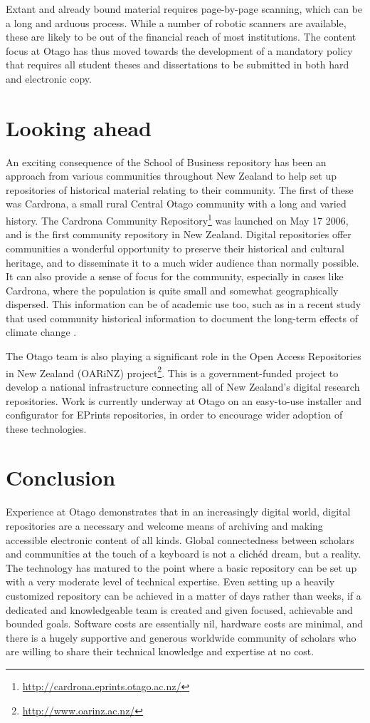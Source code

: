 \documentclass[12pt,pdftex,a4paper,titlepage]{article}
\begin{document}
Extant and already bound material requires page-by-page scanning, which can be a long and arduous process. While a number of robotic scanners are available, these are likely to be out of the financial reach of most institutions.  The content focus at Otago has thus moved towards the development of a mandatory policy that requires all student theses and dissertations to be submitted in both hard and electronic copy.


\section{Looking ahead}

An exciting consequence of the School of Business repository has been an approach from various communities throughout New Zealand to help set up repositories of historical material relating to their community. The first of these was Cardrona, a small rural Central Otago community with a long and varied history. The Cardrona Community Repository\footnote{\url{http://cardrona.eprints.otago.ac.nz/}} was launched on May 17 2006, and is the first community repository in New Zealand. Digital repositories offer communities a wonderful opportunity to preserve their historical and cultural heritage, and to disseminate it to a much wider audience than normally possible. It can also provide a sense of focus for the community, especially in cases like Cardrona, where the population is quite small and somewhat geographically dispersed. This information can be of academic use too, such as in a recent study that used community historical information to document the long-term effects of climate change \cite{Hopk-M-2006}.

The Otago team is also playing a significant role in the Open Access Repositories in New Zealand (OARiNZ) project\footnote{\url{http://www.oarinz.ac.nz/}}. This is a government-funded project to develop a national infrastructure connecting all of New Zealand's digital research repositories. Work is currently underway at Otago on an easy-to-use installer and configurator for EPrints repositories, in order to encourage wider adoption of these technologies.


\section{Conclusion}

Experience at Otago demonstrates that in an increasingly digital world, digital repositories are a necessary and welcome means of archiving and making accessible electronic content of all kinds. Global connectedness between scholars and communities at the touch of a keyboard is not a clich\'{e}d dream, but a reality. The  technology has matured to the point where a basic repository can be set up with a very moderate level of technical expertise. Even setting up a heavily customized repository can be achieved in a matter of days rather than weeks, if a dedicated and knowledgeable team is created and given focused, achievable and bounded goals. Software costs are essentially nil, hardware costs are minimal, and there is a hugely supportive and generous worldwide community of scholars who are willing to share their technical knowledge and expertise at no cost.
\end{document}
